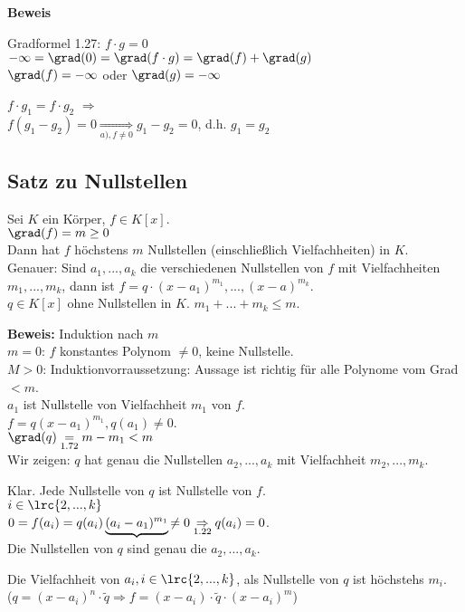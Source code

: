 	\textbf{Beweis}
	\item Gradformel 1.27: $f\cdot g=0$\\
	$-\infty=\grad(0)=\grad(f\cdot g)=\grad(f)+\grad(g)$\\
$	\grad(f)=-\infty$ oder $\grad(g)=-\infty$
\item $f\cdot g_1=f\cdot g_2$ $\Rightarrow$\\
$f(g_1-g_2)=0\underset{\scriptstyle{a),f\neq 0}}{\Rightarrow} g_1-g_2=0$, d.h. $g_1=g_2$
	\subExEnd

	\subsection{Satz zu Nullstellen}

	Sei $K$ ein Körper, $f\in K[x]$.\\
	$\grad(f)=m\geq 0$\\
	Dann hat $f$ höchstens $m$ Nullstellen (einschließlich Vielfachheiten) in $K$.\\
	Genauer: Sind $a_1,...,a_k$ die verschiedenen Nullstellen von $f$ mit Vielfachheiten $m_1,...,m_k$, dann ist $f=q\cdot(x-a_1)^{m_1},...,(x-a)^{m_k}$.\\
	$q\in K[x]$ ohne Nullstellen in $K$. $m_1+...+m_k\leq m$.

	\textbf{Beweis:} Induktion nach $m$\\
	$m=0$: $f$ konstantes Polynom $\neq 0$, keine Nullstelle.\\
	$M>0$: Induktionvorraussetzung: Aussage ist richtig für alle Polynome vom Grad $<m$.\\
	$a_1$ ist Nullstelle von Vielfachheit $m_1$ von $f$.\\
	$f=q(x-a_1)^{m_1},q(a_1)\neq 0$.\\
	$\grad(q)\underset{\mbox{\scriptsize 1.72}}{=}m-m_1<m$\\
	Wir zeigen: $q$ hat genau die Nullstellen $a_2,...,a_k$ mit Vielfachheit $m_2,...,m_k$.

	Klar. Jede Nullstelle von $q$ ist Nullstelle von $f$.\\
	$i\in\lrc{2,...,k}$\\
	$0=f(a_i)=q(a_i)\underbrace{(a_i-a_1)^{m_1}}{\neq 0}\underset{\mbox{\scriptsize 1.22}}{\Rightarrow} q(a_i)=0$.\\
	Die Nullstellen von $q$ sind genau die $a_2,...,a_k$.

	Die Vielfachheit von $a_i,i\in\lrc{2,...,k}$, als Nullstelle von $q$ ist höchstehs $m_i$.\\
	($q=(x-a_i)^n\cdot\tilde{q}\Rightarrow f=(x-a_i)\cdot\tilde{q}\cdot(x-a_i)^m$)

